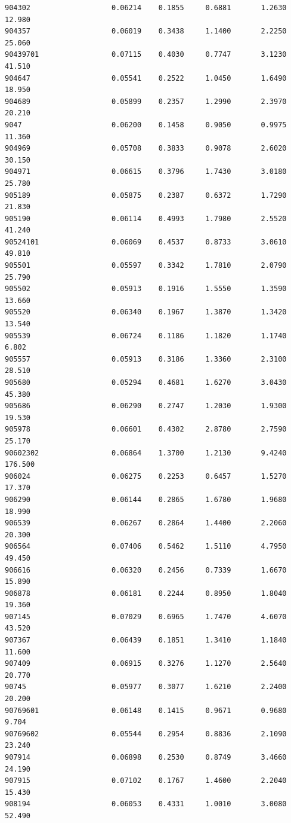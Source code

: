 \documentclass[
  letterpaper,
  DIV=11,
  numbers=noendperiod]{scrartcl}
\begin{document}
\begin{verbatim}
904302                   0.06214    0.1855     0.6881       1.2630  12.980
904357                   0.06019    0.3438     1.1400       2.2250  25.060
90439701                 0.07115    0.4030     0.7747       3.1230  41.510
904647                   0.05541    0.2522     1.0450       1.6490  18.950
904689                   0.05899    0.2357     1.2990       2.3970  20.210
9047                     0.06200    0.1458     0.9050       0.9975  11.360
904969                   0.05708    0.3833     0.9078       2.6020  30.150
904971                   0.06615    0.3796     1.7430       3.0180  25.780
905189                   0.05875    0.2387     0.6372       1.7290  21.830
905190                   0.06114    0.4993     1.7980       2.5520  41.240
90524101                 0.06069    0.4537     0.8733       3.0610  49.810
905501                   0.05597    0.3342     1.7810       2.0790  25.790
905502                   0.05913    0.1916     1.5550       1.3590  13.660
905520                   0.06340    0.1967     1.3870       1.3420  13.540
905539                   0.06724    0.1186     1.1820       1.1740   6.802
905557                   0.05913    0.3186     1.3360       2.3100  28.510
905680                   0.05294    0.4681     1.6270       3.0430  45.380
905686                   0.06290    0.2747     1.2030       1.9300  19.530
905978                   0.06601    0.4302     2.8780       2.7590  25.170
90602302                 0.06864    1.3700     1.2130       9.4240 176.500
906024                   0.06275    0.2253     0.6457       1.5270  17.370
906290                   0.06144    0.2865     1.6780       1.9680  18.990
906539                   0.06267    0.2864     1.4400       2.2060  20.300
906564                   0.07406    0.5462     1.5110       4.7950  49.450
906616                   0.06320    0.2456     0.7339       1.6670  15.890
906878                   0.06181    0.2244     0.8950       1.8040  19.360
907145                   0.07029    0.6965     1.7470       4.6070  43.520
907367                   0.06439    0.1851     1.3410       1.1840  11.600
907409                   0.06915    0.3276     1.1270       2.5640  20.770
90745                    0.05977    0.3077     1.6210       2.2400  20.200
90769601                 0.06148    0.1415     0.9671       0.9680   9.704
90769602                 0.05544    0.2954     0.8836       2.1090  23.240
907914                   0.06898    0.2530     0.8749       3.4660  24.190
907915                   0.07102    0.1767     1.4600       2.2040  15.430
908194                   0.06053    0.4331     1.0010       3.0080  52.490

\end{verbatim}
\end{document}

